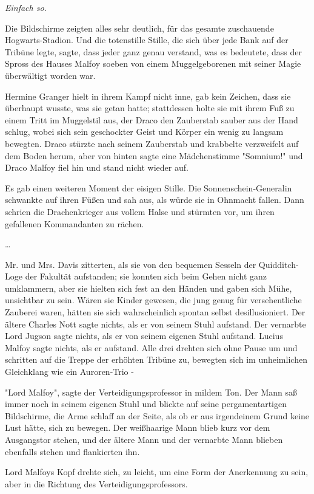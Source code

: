 {\emph{Einfach so.}

Die Bildschirme zeigten alles sehr deutlich, für das gesamte zuschauende Hogwarts-Stadion. Und die totenstille Stille, die sich über jede Bank auf der Tribüne legte, sagte, dass jeder ganz genau verstand, was es bedeutete, dass der Spross des Hauses Malfoy soeben von einem Muggelgeborenen mit seiner Magie überwältigt worden war.

Hermine Granger hielt in ihrem Kampf nicht inne, gab kein Zeichen, dass sie überhaupt wusste, was sie getan hatte; stattdessen holte sie mit ihrem Fuß zu einem Tritt im Muggelstil aus, der Draco den Zauberstab sauber aus der Hand schlug, wobei sich sein geschockter Geist und Körper ein wenig zu langsam bewegten. Draco stürzte nach seinem Zauberstab und krabbelte verzweifelt auf dem Boden herum, aber von hinten sagte eine Mädchenstimme "Somnium!" und Draco Malfoy fiel hin und stand nicht wieder auf.

Es gab einen weiteren Moment der eisigen Stille. Die Sonnenschein-Generalin schwankte auf ihren Füßen und sah aus, als würde sie in Ohnmacht fallen. Dann schrien die Drachenkrieger aus vollem Halse und stürmten vor, um ihren gefallenen Kommandanten zu rächen.

…

Mr. und Mrs. Davis zitterten, als sie von den bequemen Sesseln der Quidditch-Loge der Fakultät aufstanden; sie konnten sich beim Gehen nicht ganz umklammern, aber sie hielten sich fest an den Händen und gaben sich Mühe, unsichtbar zu sein. Wären sie Kinder gewesen, die jung genug für versehentliche Zauberei waren, hätten sie sich wahrscheinlich spontan selbst desillusioniert. Der ältere Charles Nott sagte nichts, als er von seinem Stuhl aufstand. Der vernarbte Lord Jugson sagte nichts, als er von seinem eigenen Stuhl aufstand. Lucius Malfoy sagte nichts, als er aufstand. Alle drei drehten sich ohne Pause um und schritten auf die Treppe der erhöhten Tribüne zu, bewegten sich im unheimlichen Gleichklang wie ein Auroren-Trio -

"Lord Malfoy", sagte der Verteidigungsprofessor in mildem Ton. Der Mann saß immer noch in seinem eigenen Stuhl und blickte auf seine pergamentartigen Bildschirme, die Arme schlaff an der Seite, als ob er aus irgendeinem Grund keine Lust hätte, sich zu bewegen. Der weißhaarige Mann blieb kurz vor dem Ausgangstor stehen, und der ältere Mann und der vernarbte Mann blieben ebenfalls stehen und flankierten ihn.

Lord Malfoys Kopf drehte sich, zu leicht, um eine Form der Anerkennung zu sein, aber in die Richtung des Verteidigungsprofessors.

}
